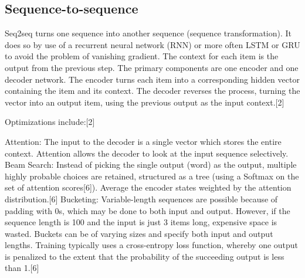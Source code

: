 \subsection{Sequence-to-sequence}
{\color{red}
	Seq2seq turns one sequence into another sequence (sequence transformation). It does so by use of a recurrent neural network (RNN) or more often LSTM or GRU to avoid the problem of vanishing gradient. The context for each item is the output from the previous step. The primary components are one encoder and one decoder network. The encoder turns each item into a corresponding hidden vector containing the item and its context. The decoder reverses the process, turning the vector into an output item, using the previous output as the input context.[2]
	
	Optimizations include:[2]
	
	Attention: The input to the decoder is a single vector which stores the entire context. Attention allows the decoder to look at the input sequence selectively.
	Beam Search: Instead of picking the single output (word) as the output, multiple highly probable choices are retained, structured as a tree (using a Softmax on the set of attention scores[6]). Average the encoder states weighted by the attention distribution.[6]
	Bucketing: Variable-length sequences are possible because of padding with 0s, which may be done to both input and output. However, if the sequence length is 100 and the input is just 3 items long, expensive space is wasted. Buckets can be of varying sizes and specify both input and output lengths.
	Training typically uses a cross-entropy loss function, whereby one output is penalized to the extent that the probability of the succeeding output is less than 1.[6]
}